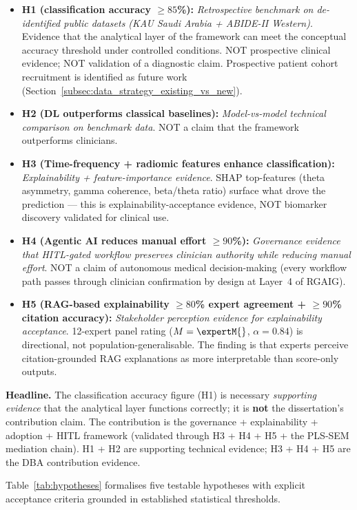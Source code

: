 \begin{itemize}[leftmargin=*, itemsep=3pt]
    \item \textbf{H1 (classification accuracy $\geq 85$\%):} \emph{Retrospective benchmark on de-identified public datasets (KAU Saudi Arabia + ABIDE-II Western)}. Evidence that the analytical layer of the framework can meet the conceptual accuracy threshold under controlled conditions. NOT prospective clinical evidence; NOT validation of a diagnostic claim. Prospective patient cohort recruitment is identified as future work (Section~\ref{subsec:data_strategy_existing_vs_new}).
    \item \textbf{H2 (DL outperforms classical baselines):} \emph{Model-vs-model technical comparison on benchmark data}. NOT a claim that the framework outperforms clinicians.
    \item \textbf{H3 (Time-frequency + radiomic features enhance classification):} \emph{Explainability + feature-importance evidence}. SHAP top-features (theta asymmetry, gamma coherence, beta/theta ratio) surface what drove the prediction --- this is explainability-acceptance evidence, NOT biomarker discovery validated for clinical use.
    \item \textbf{H4 (Agentic AI reduces manual effort $\geq 90$\%):} \emph{Governance evidence that HITL-gated workflow preserves clinician authority while reducing manual effort}. NOT a claim of autonomous medical decision-making (every workflow path passes through clinician confirmation by design at Layer~4 of RGAIG).
    \item \textbf{H5 (RAG-based explainability $\geq 80$\% expert agreement + $\geq 90$\% citation accuracy):} \emph{Stakeholder perception evidence for explainability acceptance}. 12-expert panel rating ($M = \expertM{}$, $\alpha = 0.84$) is directional, not population-generalisable. The finding is that experts perceive citation-grounded RAG explanations as more interpretable than score-only outputs.
\end{itemize}

\noindent\textbf{Headline.} The classification accuracy figure (H1) is necessary \emph{supporting evidence} that the analytical layer functions correctly; it is \textbf{not} the dissertation's contribution claim. The contribution is the governance + explainability + adoption + HITL framework (validated through H3 + H4 + H5 + the PLS-SEM mediation chain). H1 + H2 are supporting technical evidence; H3 + H4 + H5 are the DBA contribution evidence.

Table~\ref{tab:hypotheses} formalises five testable hypotheses with explicit acceptance criteria grounded in established statistical thresholds.

